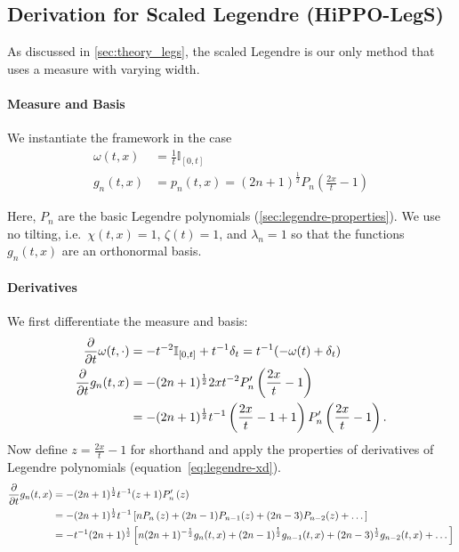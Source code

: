 \documentclass[../../hippo]{subfiles}
\begin{document}
\subsection{Derivation for Scaled Legendre (HiPPO-LegS)}
\label{sec:derivation-legs}

As discussed in \cref{sec:theory_legs},
the scaled Legendre is our only method that uses a measure with varying width.

\paragraph{Measure and Basis}
We instantiate the framework in the case
\begin{align}
  \omega(t, x) &= \frac{1}{t} \mathbb{I}_{[0, t]}
  \label{eq:scale-legendre-weight} \\
  g_n(t, x) &= p_n(t, x) = (2n+1)^{\frac{1}{2}} P_n\left( \frac{2x}{t} - 1 \right)
  \label{eq:scale-legendre-p}
\end{align}

Here, $P_n$ are the basic Legendre polynomials (\cref{sec:legendre-properties}).
We use no tilting, i.e.\ $\chi(t, x) = 1$, $\zeta(t) = 1$, and $\lambda_n=1$ so that
the functions $g_n(t, x)$ are an orthonormal basis.

\paragraph{Derivatives}

We first differentiate the measure and basis:
\begin{align*}
  \frac{\partial}{\partial t} \omega(t, \cdot)   &= -t^{-2}\mathbb{I}_{[0,t]} + t^{-1}\delta_t = t^{-1} (-\omega(t) + \delta_t)
  \nonumber \\
  \frac{\partial}{\partial t} g_n(t, x)
  &= -(2n+1)^{\frac{1}{2}} 2xt^{-2} P_n'\left( \frac{2x}{t} - 1 \right)
  \nonumber \\
  &= -(2n+1)^{\frac{1}{2}} t^{-1} \left(\frac{2x}{t} - 1 + 1\right) P_n'\left( \frac{2x}{t} - 1 \right)
  .
\end{align*}
Now define $z = \frac{2x}{t} - 1$ for shorthand and apply the properties of derivatives of Legendre polynomials (equation~\eqref{eq:legendre-xd}).
\begin{align*}
  \frac{\partial}{\partial t} g_n(t, x)
  &= -(2n+1)^{\frac{1}{2}} t^{-1} (z+1) P_n'\left( z \right)
  \\
  &= - (2n+1)^{\frac{1}{2}} t^{-1} \left[n P_n\left( z \right) + (2n-1)P_{n-1}(z) + (2n-3)P_{n-2}(z) + \dots \right]
  \nonumber \\
  &= -t^{-1} (2n+1)^{\frac{1}{2}} \left[ n (2n+1)^{-\frac{1}{2}} g_n(t, x) + (2n-1)^{\frac{1}{2}} g_{n-1}(t, x) + (2n-3)^{\frac{1}{2}}g_{n-2}(t, x) + \dots \right]
  \nonumber
\end{align*}
\end{document}
